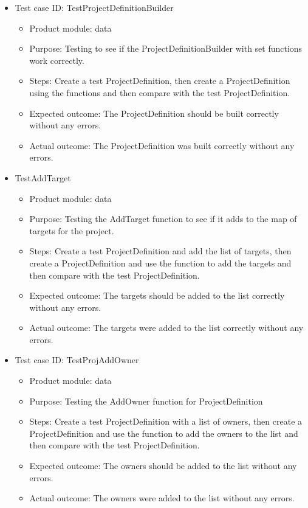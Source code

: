 \documentclass[11pt]{article}
\begin{document}
\begin{itemize}
    \item Test case ID: TestProjectDefinitionBuilder
    \begin{itemize}
        \item Product module: data
        \item Purpose: Testing to see if the ProjectDefinitionBuilder with set functions work correctly.
        \item Steps: Create a test ProjectDefinition, then create a ProjectDefinition using the functions and then compare with the test ProjectDefinition.
        \item Expected outcome: The ProjectDefinition should be built correctly without any errors.
        \item Actual outcome: The ProjectDefinition was built correctly without any errors.
    \end{itemize}
\end{itemize}

\begin{itemize}
    \item TestAddTarget
    \begin{itemize}
        \item Product module: data
        \item Purpose: Testing the AddTarget function to see if it adds to the map of targets for the project.
        \item Steps: Create a test ProjectDefinition and add the list of targets, then create a ProjectDefinition and use the function to add the targets and then compare with the test ProjectDefinition.
        \item Expected outcome: The targets should be added to the list correctly without any errors.
        \item Actual outcome: The targets were added to the list correctly without any errors.
    \end{itemize}
\end{itemize}

\begin{itemize}
    \item Test case ID: TestProjAddOwner
    \begin{itemize}
        \item Product module: data
        \item Purpose: Testing the AddOwner function for ProjectDefinition
        \item Steps: Create a test ProjectDefinition with a list of owners, then create a ProjectDefinition and use the function to add the owners to the list and then compare with the test ProjectDefinition.
        \item Expected outcome: The owners should be added to the list without any errors.
        \item Actual outcome: The owners were added to the list without any errors.
    \end{itemize}
\end{itemize}
\end{document}
